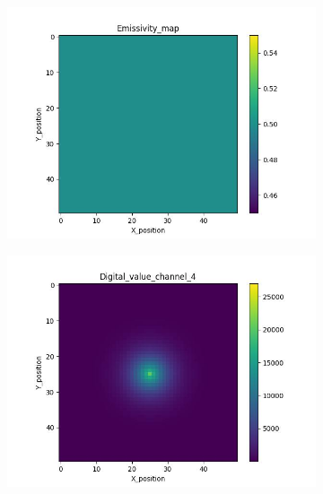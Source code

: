 \begin{figure}[htbp]
    \begin{minipage}{\textwidth}
        \centering
        \begin{subfigure}{0.45\textwidth}
            \includegraphics[width=\textwidth]{figures/raw_data/1/emi_field.jpg}
        \end{subfigure}
        \begin{subfigure}{0.45\textwidth}
            \centering
            \includegraphics[width=\textwidth]{figures/raw_data/1/digital_value_channel_4.jpg}
        \end{subfigure}
        \label{fig: raw_data_1}
    \end{minipage}\\

\end{figure}
